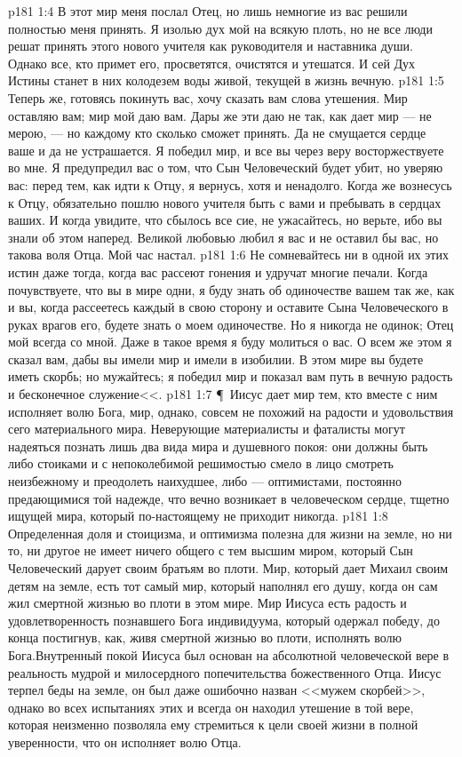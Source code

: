 \vs p181 1:4 В этот мир меня послал Отец, но лишь немногие из вас решили полностью меня принять. Я изолью дух мой на всякую плоть, но не все люди решат принять этого нового учителя как руководителя и наставника души. Однако все, кто примет его, просветятся, очистятся и утешатся. И сей Дух Истины станет в них колодезем воды живой, текущей в жизнь вечную.
\vs p181 1:5 Теперь же, готовясь покинуть вас, хочу сказать вам слова утешения. Мир оставляю вам; мир мой даю вам. Дары же эти даю не так, как дает мир --- не мерою, --- но каждому кто сколько сможет принять. Да не смущается сердце ваше и да не устрашается. Я победил мир, и все вы через веру восторжествуете во мне. Я предупредил вас о том, что Сын Человеческий будет убит, но уверяю вас: перед тем, как идти к Отцу, я вернусь, хотя и ненадолго. Когда же вознесусь к Отцу, обязательно пошлю нового учителя быть с вами и пребывать в сердцах ваших. И когда увидите, что сбылось все сие, не ужасайтесь, но верьте, ибо вы знали об этом наперед. Великой любовью любил я вас и не оставил бы вас, но такова воля Отца. Мой час настал.
\vs p181 1:6 Не сомневайтесь ни в одной их этих истин даже тогда, когда вас рассеют гонения и удручат многие печали. Когда почувствуете, что вы в мире одни, я буду знать об одиночестве вашем так же, как и вы, когда рассеетесь каждый в свою сторону и оставите Сына Человеческого в руках врагов его, будете знать о моем одиночестве. Но я никогда не одинок; Отец мой всегда со мной. Даже в такое время я буду молиться о вас. О всем же этом я сказал вам, дабы вы имели мир и имели в изобилии. В этом мире вы будете иметь скорбь; но мужайтесь; я победил мир и показал вам путь в вечную радость и бесконечное служение<<.
\vs p181 1:7 \P\ Иисус дает мир тем, кто вместе с ним исполняет волю Бога, мир, однако, совсем не похожий на радости и удовольствия сего материального мира. Неверующие материалисты и фаталисты могут надеяться познать лишь два вида мира и душевного покоя: они должны быть либо стоиками и с непоколебимой решимостью смело в лицо смотреть неизбежному и преодолеть наихудшее, либо --- оптимистами, постоянно предающимися той надежде, что вечно возникает в человеческом сердце, тщетно ищущей мира, который по\hyp{}настоящему не приходит никогда.
\vs p181 1:8 Определенная доля и стоицизма, и оптимизма полезна для жизни на земле, но ни то, ни другое не имеет ничего общего с тем высшим миром, который Сын Человеческий дарует своим братьям во плоти. Мир, который дает Михаил своим детям на земле, есть тот самый мир, который наполнял его душу, когда он сам жил смертной жизнью во плоти в этом мире. Мир Иисуса есть радость и удовлетворенность познавшего Бога индивидуума, который одержал победу, до конца постигнув, как, живя смертной жизнью во плоти, исполнять волю Бога.Внутренный покой Иисуса был основан на абсолютной человеческой вере в реальность мудрой и милосердного попечительства божественного Отца. Иисус терпел беды на земле, он был даже ошибочно назван <<мужем скорбей>>, однако во всех испытаниях этих и всегда он находил утешение в той вере, которая неизменно позволяла ему стремиться к цели своей жизни в полной уверенности, что он исполняет волю Отца.
